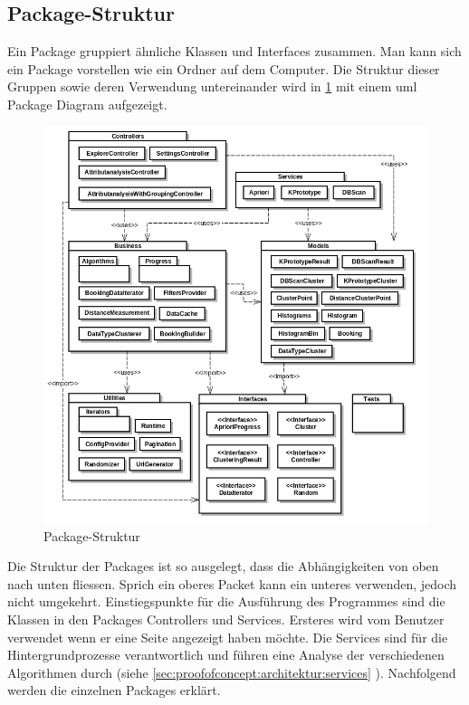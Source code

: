 \subsection{Package-Struktur}
\label{sec:proofofconcept:packagestruktur}
Ein Package gruppiert ähnliche Klassen und Interfaces zusammen. Man kann sich ein Package vorstellen wie ein Ordner auf dem Computer. Die Struktur dieser Gruppen sowie deren Verwendung untereinander wird in \cref{fig:proofofconcept:packagestruktur:1} mit einem \gls{uml} Package Diagram aufgezeigt.
\begin{figure}[H]
	\RawFloats
	\centering
	\includegraphics[width=1\textwidth]{images/diagram-package-diagram}
	\caption{Package-Struktur}
	\label{fig:proofofconcept:packagestruktur:1}
\end{figure}

Die Struktur der Packages ist so ausgelegt, dass die Abhängigkeiten von oben nach unten fliessen. Sprich ein oberes Packet kann ein unteres verwenden, jedoch nicht umgekehrt. Einstiegspunkte für die Ausführung des Programmes sind die Klassen in den Packages Controllers und Services. Ersteres wird vom Benutzer verwendet wenn er eine Seite angezeigt haben möchte. Die Services sind für die Hintergrundprozesse verantwortlich und führen eine Analyse der verschiedenen Algorithmen durch (siehe \cref{sec:proofofconcept:architektur:services} ). Nachfolgend werden die einzelnen Packages erklärt.

